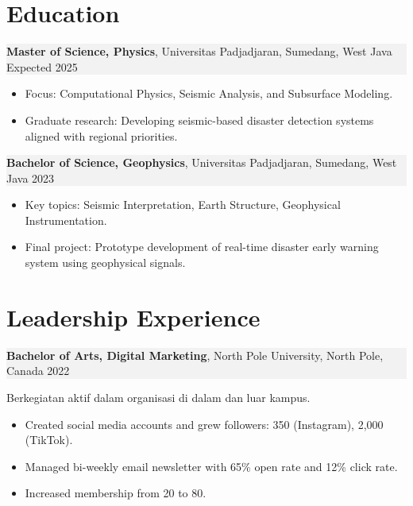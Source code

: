 \documentclass[11pt,a4paper]{article}
\begin{document}
\section*{Education}

\noindent
\setlength{\fboxsep}{0pt}%
\colorbox[HTML]{F2F2F2}{%
  \parbox{\linewidth}{%
    \textbf{Master of Science, Physics}, Universitas Padjadjaran, Sumedang, West Java \hfill Expected 2025%
  }%
}
\begin{itemize}[left=1.5em, noitemsep, topsep=0pt]
    \item Focus: Computational Physics, Seismic Analysis, and Subsurface Modeling.
    \item Graduate research: Developing seismic-based disaster detection systems aligned with regional priorities.
\end{itemize}

\noindent
\setlength{\fboxsep}{0pt}%
\colorbox[HTML]{F2F2F2}{%
  \parbox{\linewidth}{%
    \textbf{Bachelor of Science, Geophysics}, Universitas Padjadjaran, Sumedang, West Java \hfill 2023%
  }%
}
\begin{itemize}[left=1.5em, noitemsep, topsep=0pt]
    \item Key topics: Seismic Interpretation, Earth Structure, Geophysical Instrumentation.
    \item Final project: Prototype development of real-time disaster early warning system using geophysical signals.
\end{itemize}


\vspace{0.3em}

\section*{Leadership Experience}
\noindent
\setlength{\fboxsep}{0pt}%
\colorbox[HTML]{F2F2F2}{%
  \parbox{\linewidth}{%
    \textbf{Bachelor of Arts, Digital Marketing}, North Pole University, North Pole, Canada \hfill 2022%
  }%
}
\vspace{0.3em}
Berkegiatan aktif dalam organisasi di dalam dan luar kampus.

\begin{itemize}[left=1.5em, noitemsep, topsep=0pt]
    \item Created social media accounts and grew followers: 350 (Instagram), 2,000 (TikTok).
    \item Managed bi-weekly email newsletter with 65\% open rate and 12\% click rate.
    \item Increased membership from 20 to 80.
\end{itemize}
\end{document}
